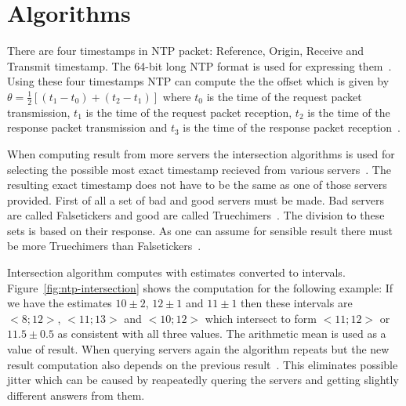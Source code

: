 
\section{Algorithms}


There are four timestamps in NTP packet: Reference, Origin, Receive and Transmit timestamp.
The 64-bit long NTP format is used for expressing them~\cite{rfc5905}.
Using these four timestamps NTP can compute the
the offset which is given by $\theta = \frac{1}{2}[(t_1 - t_0) + (t_2 - t_1)]$
where $t_0$ is the time of the request packet transmission,
$t_1$ is the time of the request packet reception,
$t_2$ is the time of the response packet transmission and
$t_3$ is the time of the response packet reception~\cite{ntp-algor}.

When computing result from more servers the intersection algorithms is used
for selecting the possible most exact timestamp recieved from various servers~\cite{rfc5905}.
The resulting exact timestamp does not have to be the same
as one of those servers provided.
First of all a set of bad and good servers must be made.
Bad servers are called Falsetickers and good are called Truechimers~\cite{rfc5905}.
The division to these sets is based on their response.
As one can assume for sensible result there must be more Truechimers than Falsetickers~\cite{rfc5905}.

Intersection algorithm computes with estimates converted to intervals.
Figure~\ref{fig:ntp-intersection} shows the computation for the following example:
If we have the estimates $10 \pm 2$, $12 \pm 1$ and $11 \pm 1$
then these intervals are $<8; 12>$, $<11; 13>$ and $<10; 12>$ which
intersect to form $<11; 12>$ or $11.5 \pm 0.5$ as consistent with all three values.
The arithmetic mean is used as a value of result.
When querying servers again the algorithm repeats but the new result computation
also depends on the previous result~\cite{rfc5905}.
This eliminates possible jitter which can be caused by reapeatedly quering the servers
and getting slightly different answers from them.

